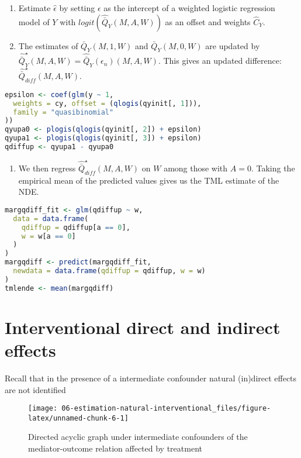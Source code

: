 \documentclass[
  12pt,
]{book}
\providecommand{\tightlist}{%
  \setlength{\itemsep}{0pt}\setlength{\parskip}{0pt}}
\theoremstyle{definition}
\theoremstyle{definition}
\theoremstyle{definition}
\newcommand{\1}{\mathbbm{1}}
\begin{document}
\begin{enumerate}
\def\labelenumi{\arabic{enumi}.}
\setcounter{enumi}{3}
\item
  Estimate \(\hat{\epsilon}\) by setting \(\epsilon\) as the intercept of a
  weighted logistic regression model of \(Y\) with
  \(logit(\hat{\bar{Q}}_{Y}(M,A,W))\) as an offset and weights \(\hat{C}_{Y}\).
\item
  The estimates of \(\bar{Q}_{Y}(M,1,W)\) and \(\bar{Q}_{Y}(M,0,W)\) are updated
  by \(\hat{\bar{Q}}^{\star}_{Y}(M,A,W) = \hat{\bar{Q}}_{Y}(\epsilon_n)(M,A,W)\). This gives an updated difference:
  \(\hat{\bar{Q}}^{\star}_{diff}(M,A,W)\).
\end{enumerate}

\begin{lstlisting}[language=R]
epsilon <- coef(glm(y ~ 1,
  weights = cy, offset = (qlogis(qyinit[, 1])),
  family = "quasibinomial"
))
qyupa0 <- plogis(qlogis(qyinit[, 2]) + epsilon)
qyupa1 <- plogis(qlogis(qyinit[, 3]) + epsilon)
qdiffup <- qyupa1 - qyupa0
\end{lstlisting}

\begin{enumerate}
\def\labelenumi{\arabic{enumi}.}
\setcounter{enumi}{5}
\tightlist
\item
  We then regress \(\hat{\bar{Q}}^{\star}_{diff}(M,A,W)\) on \(W\) among those
  with \(A=0\). Taking the empirical mean of the predicted values gives us the
  TML estimate of the NDE.
\end{enumerate}

\begin{lstlisting}[language=R]
margqdiff_fit <- glm(qdiffup ~ w,
  data = data.frame(
    qdiffup = qdiffup[a == 0],
    w = w[a == 0]
  )
)
margqdiff <- predict(margqdiff_fit,
  newdata = data.frame(qdiffup = qdiffup, w = w)
)
tmlende <- mean(margqdiff)
\end{lstlisting}

\hypertarget{interventional-direct-and-indirect-effects}{%
\section{Interventional direct and indirect effects}\label{interventional-direct-and-indirect-effects}}

Recall that in the presence of a intermediate confounder natural (in)direct effects are not identified

\begin{figure}

{\centering \texttt{[image: 06-estimation-natural-interventional\_files/figure-latex/unnamed-chunk-6-1]} 

}

\caption{Directed acyclic graph under intermediate confounders of the mediator-outcome relation affected by treatment}\label{fig:unnamed-chunk-6}
\end{figure}
\end{document}
